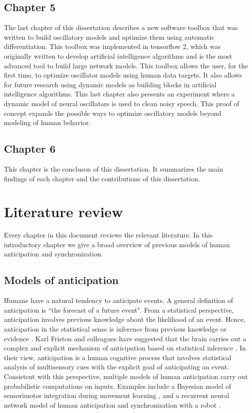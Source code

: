 \documentclass{report}
\begin{document}
\subsection{Chapter 5}
The last chapter of this dissertation describes a new software toolbox that was written to build oscillatory models and optimize them using automatic differentiation. This toolbox was implemented in tensorflow 2, which was originally written to develop artificial intelligence algorithms and is the most advanced tool to build large network models. This toolbox allows the user, for the first time, to optimize oscillator models using human data targets. It also allows for future research using dynamic models as building blocks in artificial intelligence algorithms. This last chapter also presents an experiment where a dynamic model of neural oscillators is used to clean noisy speech. This proof of concept expands the possible ways to optimize oscillatory models beyond modeling of human behavior. 

\subsection{Chapter 6}
This chapter is the concluson of this dissertation. It summarizes the main findings of each chapter and the contributions of this dissertation.

\section{Literature review}

Every chapter in this document reviews the relevant literature. In this introductory chapter we give a broad overview of previous models of human anticipation and synchronization.

\subsection{Models of anticipation}
Humans have a natural tendency to anticipate events. A general definition of anticipation is ``the forecast of a future event". From a statistical perspective, anticipation involves previous knowledge about the likelihood of an event. Hence, anticipation in the statistical sense is inference from previous knowledge or evidence \cite{cox2006principles}. Karl Friston and colleagues have suggested that the brain carries out a complex and explicit mechanism of anticipation based on statistical inference \cite{maffei2017perceptual}. In their view, anticipation is a human cognitive process that involves statistical analysis of multisensory cues with the explicit goal of anticipating an event. Consistent with this perspective, multiple models of human anticipation carry out probabilistic computations on inputs. Examples include a Bayesian model of sensorimotor integration during movement learning \cite{kording2004bayesian}, and a recurrent neural network model of human anticipation and synchronization with a robot \cite{schydlo2018anticipation}. 
\end{document}
